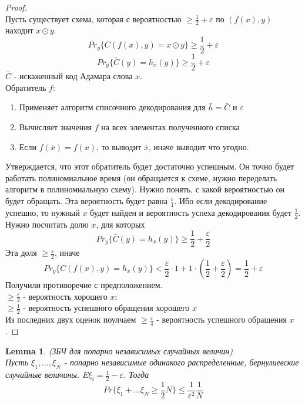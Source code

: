 \documentclass[a4paper]{article}
\theoremstyle{definition}
\theoremstyle{plain}
\newtheorem{lemma}{Lemma}
\begin{document}
\begin{proof}~\\
	Пусть существует схема, которая с вероятностью $\ge \frac{1}{2} + \varepsilon$ по $(f(x), y)$
	находит $x \odot y$.
	$$
		Pr_y\{C(f(x), y) = x \odot y \} \ge \frac{1}{2} + \varepsilon
	$$
	$$
		Pr_y\{\bar{C}(y) = h_x(y) \} \ge \frac{1}{2} + \varepsilon
	$$
	$\bar{C}$ - искаженный код Адамара слова $x$.~\\
	
	
	\noindent Обратитель $f$:
	\begin{enumerate}
		\item Применяет алгоритм списочного декодирования для $\bar{h} = \bar{C}$ и $\varepsilon$
		\item Вычисляет значения $f$ на всех элементах полученного списка
		\item Если $f(\bar{x}) = f(x)$, то выводит $\bar{x}$, иначе выводит что угодно.
	\end{enumerate}
	Утверждается, что этот обратитель будет достаточно успешным. Он точно будет работать
	полиномиальное время (он обращается к схеме, нужно переделать алгоритм в полиномиальную схему).
	Нужно понять, с какой вероятностью он будет обращать.
	Эта вероятность будет равна $\frac{\varepsilon}{4}$. Ибо если декодирование успешно, то
	нужный $x$ будет найден и вероятность успеха декодирования будет $\frac{1}{2}$.
	Нужно посчитать долю $x$, для которых
	$$
		Pr_y\{\bar{C}(y) = h_x(y)\} \ge \frac{1}{2} + \frac{\varepsilon}{2}	
	$$
	Эта доля $\ge \frac{\varepsilon}{2}$, иначе
	$$
		Pr_y\{C(f(x), y) = h_x(y)\} < \frac{\varepsilon}{2}\cdot 1 + 1\cdot(\frac{1}{2} + \frac{\varepsilon}{2}) = \frac{1}{2} + \varepsilon	
	$$
	Получили противоречие с предположением.~\\
	
	\noindent $\ge \frac{\varepsilon}{2}$ - вероятность хорошего $x$;~\\
	
	\noindent $\ge \frac{1}{2}$ - вероятность успешного обращения хорошего $x$~\\
	
	\noindent Из последних двух оценок поулчаем $\ge \frac{\varepsilon}{4}$ - вероятность
	успешного обращения $x$.
\end{proof}

\begin{lemma}(ЗБЧ для попарно независимых случайных величин)~\\
	Пусть $\xi_1, \ldots, \xi_N$ - попарно независимые одинакого распределенные,
	бернулиевские случайные величины.
	$E\xi_i = \frac{1}{2} - \varepsilon$. Тогда
	$$
		Pr\{\xi_1 + \ldots \xi_N \ge \frac{1}{2}N\} \le \frac{1}{\varepsilon^2}\frac{1}{N}	
	$$
\end{lemma}
\end{document}
